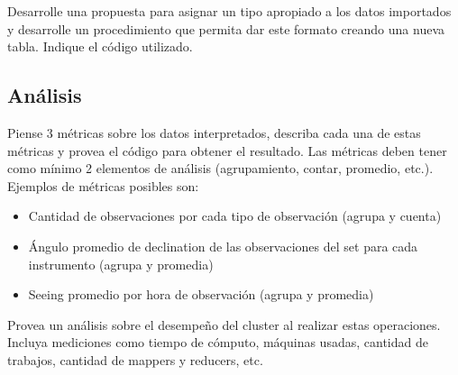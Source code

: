 \documentclass[12pt,letterpaper,twoside]{article}
\begin{document}
{\color{red} Desarrolle una propuesta para asignar un tipo apropiado a los datos importados y desarrolle un procedimiento que permita dar este formato creando una nueva tabla. Indique el código utilizado.}

\subsection{Análisis}

{\color{red} Piense 3 métricas sobre los datos interpretados, describa cada una de estas métricas y provea el código para obtener el resultado. Las métricas deben tener como mínimo 2 elementos de análisis (agrupamiento, contar, promedio, etc.). Ejemplos de métricas posibles son:
\begin{itemize}
  \item Cantidad de observaciones por cada tipo de observación (agrupa y cuenta)
  \item Ángulo promedio de declination de las observaciones del set para cada instrumento (agrupa y promedia)
  \item Seeing promedio por hora de observación (agrupa y promedia)
\end{itemize}
Provea un análisis sobre el desempeño del cluster al realizar estas operaciones. Incluya mediciones como tiempo de cómputo, máquinas usadas, cantidad de trabajos, cantidad de mappers y reducers, etc.}
\end{document}

